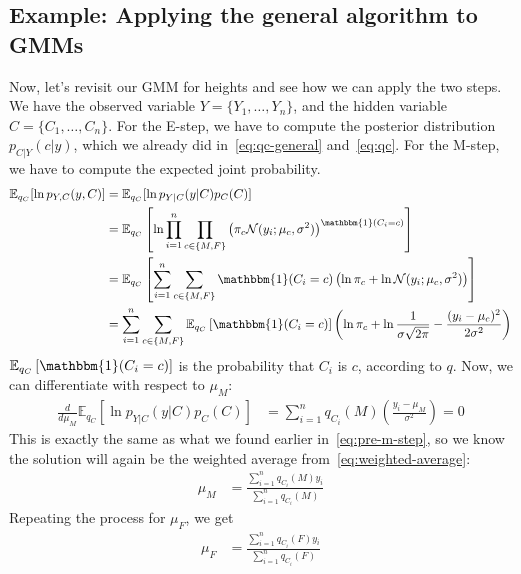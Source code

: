 \documentclass[12pt]{article}
\newcommand{\N}{\mathcal{N}}
\newcommand{\indicator}{\mathbbm{1}}
\begin{document}
    \subsection{Example: Applying the general algorithm to GMMs}
    Now, let's revisit our GMM for heights and see how we can apply the two
    steps. We have the observed variable $Y = \{Y_1, \ldots, Y_n\}$, and the
    hidden variable $C = \{C_1, \ldots, C_n\}$. For the E-step, we have to
    compute the posterior distribution $p_{C|Y}(c|y)$, which we already did
    in~\eqref{eq:qc-general} and~\eqref{eq:qc}. For the M-step, we have to
    compute the expected joint probability.
    \begin{align*}
        \mathbb{E}_{q_C}[\ln p_{Y,C}(y,C)]
        &= \mathbb{E}_{q_C}[\ln p_{Y|C}(y|C)p_C(C)] \\
        &= \mathbb{E}_{q_C}\left[\ln \prod_{i=1}^n \prod_{c \in \{M, F\}} \left(\pi_c\N(y_i; \mu_c, \sigma^2)\right)^{\indicator(C_i = c)}\right] \\
        &= \mathbb{E}_{q_C}\left[ \sum_{i=1}^n \sum_{c \in \{M, F\}} \indicator(C_i = c) \left(\ln \pi_c + \ln \N(y_i; \mu_c, \sigma^2)\right)\right] \\
        &=  \sum_{i=1}^n \sum_{c \in \{M, F\}} \mathbb{E}_{q_C}\left[\indicator(C_i = c)\right] \left(\ln \pi_c + \ln \frac{1}{\sigma\sqrt{2\pi}} - \frac{(y_i-\mu_c)^2}{2\sigma^2} \right)
    \end{align*}
    $\mathbb{E}_{q_C}\left[\indicator(C_i = c)\right]$ is the
    probability that $C_i$ is $c$, according to $q$. Now, we can differentiate
    with respect to $\mu_M$:
    \begin{align*}
        \frac{d}{d\mu_M} \mathbb{E}_{q_C}[\ln p_{Y|C}(y|C)p_C(C)]
        &= \sum_{i=1}^n q_{C_i}(M) \left(\frac{y_i-\mu_M}{\sigma^2}\right) = 0
    \end{align*}
    This is exactly the same as what we found earlier in~\eqref{eq:pre-m-step},
    so we know the solution will again be the weighted average
    from~\eqref{eq:weighted-average}:
    \begin{align*}
        \mu_M &= \frac{\displaystyle \sum_{i=1}^n q_{C_i}(M) y_i}{\displaystyle \sum_{i=1}^n q_{C_i}(M)}
    \end{align*}
    Repeating the process for $\mu_F$, we get
    \begin{align*}
        \mu_F &= \frac{\displaystyle \sum_{i=1}^n q_{C_i}(F) y_i}{\displaystyle \sum_{i=1}^n q_{C_i}(F)}
    \end{align*}
\end{document}

